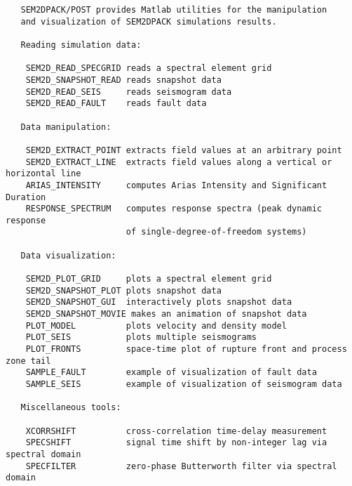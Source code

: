 \begin{verbatim}
   SEM2DPACK/POST provides Matlab utilities for the manipulation
   and visualization of SEM2DPACK simulations results.

   Reading simulation data:

    SEM2D_READ_SPECGRID reads a spectral element grid
    SEM2D_SNAPSHOT_READ reads snapshot data
    SEM2D_READ_SEIS     reads seismogram data
    SEM2D_READ_FAULT    reads fault data

   Data manipulation:

    SEM2D_EXTRACT_POINT extracts field values at an arbitrary point
    SEM2D_EXTRACT_LINE  extracts field values along a vertical or horizontal line
    ARIAS_INTENSITY     computes Arias Intensity and Significant Duration
    RESPONSE_SPECTRUM   computes response spectra (peak dynamic response
                        of single-degree-of-freedom systems)

   Data visualization:

    SEM2D_PLOT_GRID     plots a spectral element grid
    SEM2D_SNAPSHOT_PLOT plots snapshot data
    SEM2D_SNAPSHOT_GUI  interactively plots snapshot data
    SEM2D_SNAPSHOT_MOVIE makes an animation of snapshot data
    PLOT_MODEL          plots velocity and density model
    PLOT_SEIS           plots multiple seismograms
    PLOT_FRONTS         space-time plot of rupture front and process zone tail
    SAMPLE_FAULT        example of visualization of fault data
    SAMPLE_SEIS         example of visualization of seismogram data

   Miscellaneous tools:

    XCORRSHIFT          cross-correlation time-delay measurement
    SPECSHIFT           signal time shift by non-integer lag via spectral domain
    SPECFILTER          zero-phase Butterworth filter via spectral domain

\end{verbatim}
